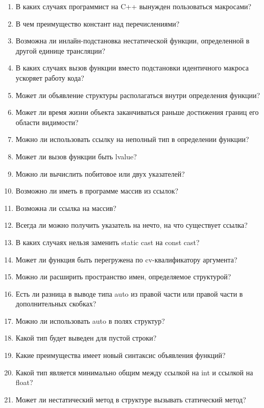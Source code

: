 \documentclass[a4paper,12pt,oneside]{article}
\newif\ifanswers
\begin{document}
\begin{enumerate}
\ifanswers
Ответ: было в лекциях, см. пример с signal.
\fi

\item В каких случаях программист на C++ вынужден пользоваться макросами?

\ifanswers
Ответ: условная компиляция, стражи включения, вот это всё.
\fi

\item В чем преимущество констант над перечислениями?

\ifanswers
Ответ: их много, как и наоборот. Например, всегда можно дописать ещё констант в другом заголовочнике, а закрытое перечисление не переоткроешь
\fi

\item Возможна ли инлайн-подстановка нестатической функции, определенной в другой единице трансляции?

\ifanswers
Ответ: формально да в lto-режиме, но откуда это знать бедному студенту. А если исходить из текста лекций, то скорее нет.
\fi

\item В каких случаях вызов функции вместо подстановки идентичного макроса ускоряет работу кода?

\ifanswers
Ответ: был в лекциях пример с sqr
\fi

\item Может ли объявление структуры располагаться внутри определения функции?
\item Может ли время жизни объекта заканчиваться раньше достижения границ его области видимости?
\item Можно ли использовать ссылку на неполный тип в определении функции?
\item Может ли вызов функции быть lvalue?
\item Можно ли вычислить побитовое или двух указателей?
\item Возможно ли иметь в программе массив из ссылок?
\item Возможна ли ссылка на массив?
\item Всегда ли можно получить указатель на нечто, на что существует ссылка?
\item В каких случаях нельзя заменить static cast на const cast?
\item Может ли функция быть перегружена по cv-квалификатору аргумента?
\item Можно ли расширить пространство имен, определяемое структурой?
\item Есть ли разница в выводе типа auto из правой части или правой части в дополнительных скобках?
\item Можно ли использовать auto в полях структур?
\item Какой тип будет выведен для пустой строки?
\item Какие преимущества имеет новый синтаксис объявления функций?
\item Какой тип является минимально общим между ссылкой на int и ссылкой на float?
\item Может ли нестатический метод в структуре вызывать статический метод?


\end{enumerate}
\end{document}
